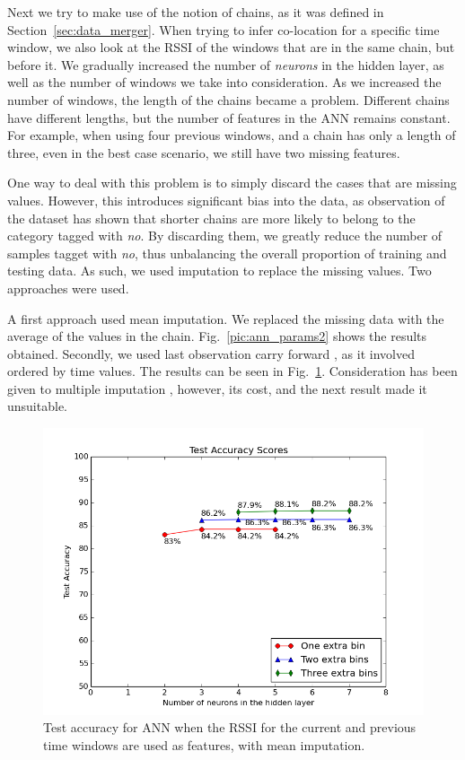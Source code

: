 Next we try to make use of the notion of chains, as it was defined in Section~\ref{sec:data_merger}. When trying to infer co-location for a specific time window, we also look at the RSSI of the windows that are in the same chain, but before it. We gradually increased the number of \textit{neurons} in the hidden layer, as well as the number of windows we take into consideration. As we increased the number of windows, the length of the chains became a problem. Different chains have different lengths, but the number of features in the ANN remains constant. For example, when using four previous windows, and a chain has only a length of three, even in the best case scenario, we still have two missing features. 

One way to deal with this problem is to simply discard the cases that are missing values. However, this introduces significant bias into the data, as observation of the dataset has shown that shorter chains are more likely to belong to the category tagged with \textit{no}. By discarding them, we greatly reduce the number of samples tagget with \textit{no}, thus unbalancing the overall proportion of training and testing data. As such, we used imputation to replace the missing values. Two approaches were used.

A first approach used mean imputation. We replaced the missing data with the average of the values in the chain. Fig.~\ref{pic:ann_params2} shows the results obtained. Secondly, we used last observation carry forward \cite{locf}, as it involved ordered by time values. The results can be seen in Fig.~\ref{pic:ann_params1}. Consideration has been given to multiple imputation \cite{rubin2009multiple}, however, its cost, and the next result made it unsuitable.  

\begin{figure}[h]
	\begin{center}
		\includegraphics[scale=0.6]{figures/ann_params2.png}
	\end{center}
	
	\caption{Test accuracy for ANN when the RSSI for the current and previous time windows are used as features, with mean imputation.}
	\label{pic:ann_params1}

\end{figure}

